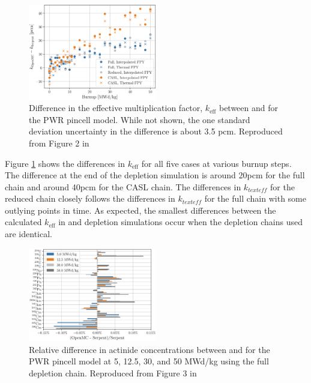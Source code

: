 \begin{figure}[htpb]
    \centering
    \includegraphics[width=0.5\textwidth]{figs/ch2/serpent_openmc_keff.png}
    \caption[Difference in the effective multiplication factor, $k_\text{eff}$
    between OpenMC and Serpent for the PWR pincell model.]{Difference in the
    effective multiplication factor, $k_\text{eff}$ between \OpenMC and \SerpentTWO
    for the PWR pincell model. While not shown, the one standard deviation
    uncertainty in the difference is about 3.5 pcm. Reproduced from Figure 2 in
    \cite{romano_depletion_2021}}
    \label{fig:pwr-serpent-openmc-keff}
\end{figure}

Figure \ref{fig:pwr-serpent-openmc-keff} shows the differences in $k_\text{eff}$
for all five cases at various burnup steps. The difference at the end of the depletion simulation is
around 20pcm for the full chain and around 40pcm for the CASL chain. The
differences in $k_{text{eff}}$ for the reduced chain closely follows the differences in $k_{text{eff}}$ for the full chain with some outlying
points in time. As expected, the smallest differences between the calculated
$k_\text{eff}$ in \SerpentTWO and \OpenMC depletion simulations occur when the
depletion chains used are identical.

\begin{figure}[htpb]
    \centering
    \includegraphics[width=0.5\textwidth]{figs/ch2/serpent_openmc_actinides.png}
    \caption[Relative difference in actinide concentrations between OpenMC and
    Serpent for the PWR pincell model.]{Relative difference in actinide
    concentrations between \OpenMC and \SerpentTWO for the PWR pincell model at 5,
    12.5, 30, and 50 MWd/kg using the full depletion chain. Reproduced from
    Figure 3 in \cite{romano_depletion_2021}}
    \label{fig:pwr-serpent-openmc-actinides}
\end{figure}

